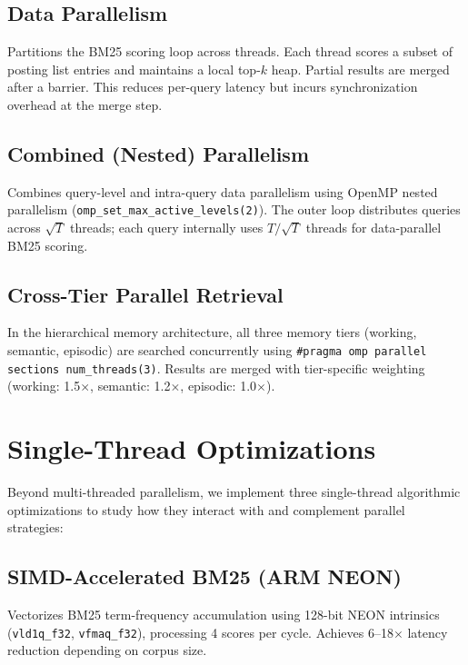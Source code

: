 \documentclass[11pt]{article}
\begin{document}
\subsection{Data Parallelism}
Partitions the BM25 scoring loop across threads. Each thread scores a subset of posting list entries and maintains a local top-$k$ heap. Partial results are merged after a barrier. This reduces per-query latency but incurs synchronization overhead at the merge step.

\subsection{Combined (Nested) Parallelism}
Combines query-level and intra-query data parallelism using OpenMP nested parallelism (\texttt{omp\_set\_max\_active\_levels(2)}). The outer loop distributes queries across $\sqrt{T}$ threads; each query internally uses $T/\sqrt{T}$ threads for data-parallel BM25 scoring.

\subsection{Cross-Tier Parallel Retrieval}
In the hierarchical memory architecture, all three memory tiers (working, semantic, episodic) are searched concurrently using \texttt{\#pragma omp parallel sections num\_threads(3)}. Results are merged with tier-specific weighting (working: 1.5$\times$, semantic: 1.2$\times$, episodic: 1.0$\times$).

\section{Single-Thread Optimizations}

Beyond multi-threaded parallelism, we implement three single-thread algorithmic optimizations to study how they interact with and complement parallel strategies:

\subsection{SIMD-Accelerated BM25 (ARM NEON)}
Vectorizes BM25 term-frequency accumulation using 128-bit NEON intrinsics (\texttt{vld1q\_f32}, \texttt{vfmaq\_f32}), processing 4 scores per cycle. Achieves 6--18$\times$ latency reduction depending on corpus size.
\end{document}
